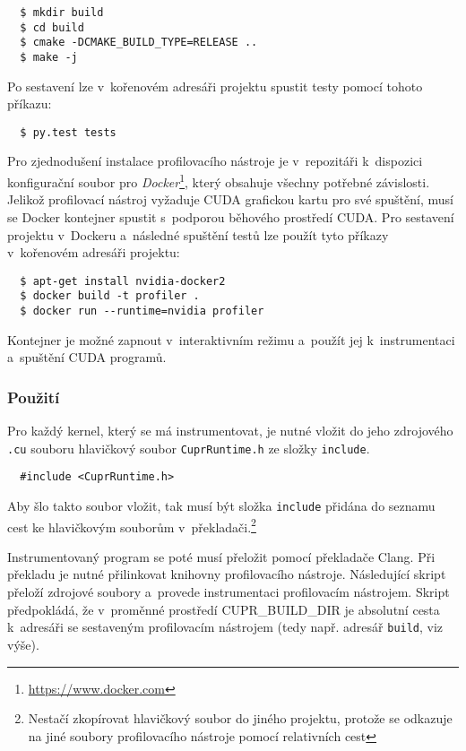 \noindent
\begin{minipage}{\textwidth}
	\begin{verbatim}
  $ mkdir build
  $ cd build
  $ cmake -DCMAKE_BUILD_TYPE=RELEASE ..
  $ make -j
	\end{verbatim}
\end{minipage}

Po sestavení lze v~kořenovém adresáři projektu spustit testy pomocí tohoto příkazu:
\begin{verbatim}
  $ py.test tests
\end{verbatim}

Pro zjednodušení instalace profilovacího nástroje je v~repozitáři k~dispozici konfigurační soubor pro \emph{Docker}\footnote{\url{https://www.docker.com}}, který obsahuje všechny potřebné závislosti. Jelikož profilovací nástroj vyžaduje CUDA grafickou kartu pro své spuštění, musí se Docker kontejner spustit s~podporou běhového prostředí CUDA. Pro sestavení projektu v~Dockeru a~následné spuštění testů lze použít tyto příkazy v~kořenovém adresáři projektu:
\begin{verbatim}
  $ apt-get install nvidia-docker2
  $ docker build -t profiler .
  $ docker run --runtime=nvidia profiler
\end{verbatim}

Kontejner je možné zapnout v~interaktivním režimu a~použít jej k~instrumentaci a~spuštění CUDA programů.

\subsubsection{Použití}
\label{manual:usage}
Pro každý kernel, který se má instrumentovat, je nutné vložit do jeho zdrojového \texttt{.cu} souboru hlavičkový soubor \texttt{CuprRuntime.h} ze složky \texttt{include}.
\begin{verbatim}
  #include <CuprRuntime.h>
\end{verbatim}
Aby šlo takto soubor vložit, tak musí být složka \texttt{include} přidána do seznamu cest ke hlavičkovým souborům v~překladači.\footnote{Nestačí zkopírovat hlavičkový soubor do jiného projektu, protože se odkazuje na jiné soubory profilovacího nástroje pomocí relativních cest}

Instrumentovaný program se poté musí přeložit pomocí překladače Clang. Při překladu je nutné přilinkovat knihovny profilovacího nástroje. Následující skript přeloží zdrojové soubory a~provede instrumentaci profilovacím nástrojem. Skript předpokládá, že v~proměnné prostředí CUPR\_BUILD\_DIR je absolutní cesta k~adresáři se sestaveným profilovacím nástrojem (tedy např. adresář \texttt{build}, viz výše).

